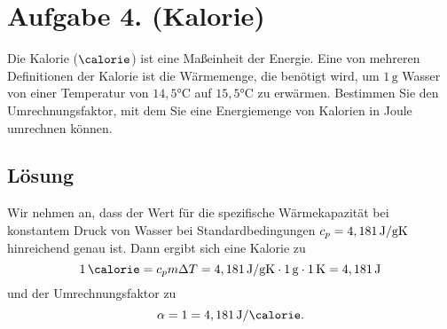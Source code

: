 \documentclass[german,12pt]{homework}
\begin{document}
    \section*{Aufgabe 4. (Kalorie)}

    \begin{problem}
        Die Kalorie (\(\si{\calorie}\)) ist eine Maßeinheit der Energie. Eine
        von mehreren Definitionen der Kalorie ist die Wärmemenge, die benötigt
        wird, um \(1\,\si{\g}\) Wasser von einer Temperatur von
        \(14,5\si{\degreeCelsius}\) auf \(15,5\si{\degreeCelsius}\) zu
        erwärmen. Bestimmen Sie den Umrechnungsfaktor, mit dem Sie eine
        Energiemenge von Kalorien in Joule umrechnen können.
    \end{problem}

    \subsection*{Lösung} Wir nehmen an, dass der Wert für die spezifische
    Wärmekapazität bei konstantem Druck von Wasser bei Standardbedingungen
    \(c_p = 4,181\,\si{\joule\per{\g\kelvin}}\) hinreichend genau ist. Dann
    ergibt sich eine Kalorie zu
    \[1\,\si{\calorie} = c_pm{\Delta}T = 4,181\,\si{\joule\per{\g\kelvin}}
    \cdot 1\,\si{\g} \cdot 1\,\si{\kelvin} = 4,181\,\si{\joule}\]
    und der Umrechnungsfaktor zu
    \[\alpha = 1 = 4,181\,\si{\joule\per{\calorie}}.\]
\end{document}
